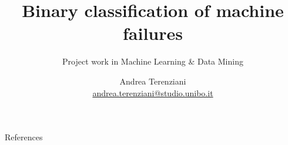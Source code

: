 \documentclass[10pt]{beamer}
\title{Binary classification of machine failures}
\subtitle{Project work in Machine Learning \& Data Mining}
\author{ Andrea Terenziani \\ \footnotesize \href{mailto:andrea.terenziani@studio.unibo.it}{andrea.terenziani@studio.unibo.it}}
\institute{University of Bologna}
\date{}
\begin{document}
\begin{frame}
\titlepage
\end{frame}

\begin{frame}{\contentsname}
\begin{multicols}{2}
\tableofcontents
\end{multicols}
\end{frame}







\begin{frame}[allowframebreaks]{References}
    \small
    
\end{frame}
\end{document}
